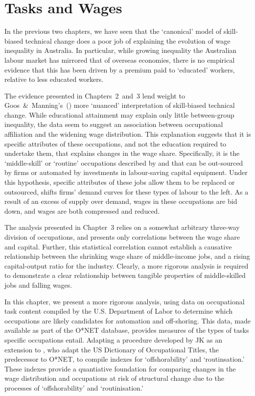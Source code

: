 
\section{Tasks and Wages}

In the previous two chapters, we have seen that the `canonical' model of skill-biased technical change does a poor job of explaining the evolution of wage inequality in Australia. In particular, while growing inequality the Australian labour market has mirrored that of overseas economies, there is no empirical evidence that this has been driven by a premium paid to `educated' workers, relative to less educated workers. 

The evidence presented in Chapters~2~and~3 lend weight to Goos~\&~Manning's~(\citeyear{Goos2007}) more `nuanced' interpretation of skill-biased technical change. While educational attainment may explain only little between-group inequality, the data seem to suggest an association between occupational affiliation and the widening wage distribution. This explanation suggests that it is specific attributes of these occupations, and not the education required to undertake them, that explains changes in the wage share. Specifically, it is the `middle-skill' or `routine' occupations described by \citet{Levy2003} and \citet{Goos2009} that can be out-sourced by firms or automated by investments in labour-saving capital equipment. Under this hypothesis, specific attributes of these jobs allow them to be replaced or outsourced, shifts firms' demand curves for these types of labour to the left. As a result of an excess of supply over demand, wages in these occupations are bid down, and wages are both compressed and reduced. 

The analysis presented in Chapter~3 relies on a somewhat arbitrary three-way division of occupations, and presents only correlations between the wage share and capital. Further, this statistical correlation cannot establish a causative relationship between the shrinking wage share of middle-income jobs, and a rising capital-output ratio for the industry. Clearly, a more rigorous analysis is required to demonstrate a clear relationship between tangible properties of middle-skilled jobs and falling wages.

In this chapter, we present a more rigorous analysis, using data on occupational task content compiled by the U.S. Department of Labor to determine which occupations are likely candidates for automation and off-shoring. This data, made available as part of the O*NET database, provides measures of the types of tasks specific occupations entail. Adapting a procedure developed by JK as an extension to \citet{Levy2003}, who adapt the US Dictionary of Occupational Titles, the predecessor to O*NET, to compile indexes for `offshorability' and `routinsation.' These indexes provide a quantiative foundation for comparing changes in the wage distribution and occupations at risk of structural change due to the processes of `offshorability' and `routinisation.'

